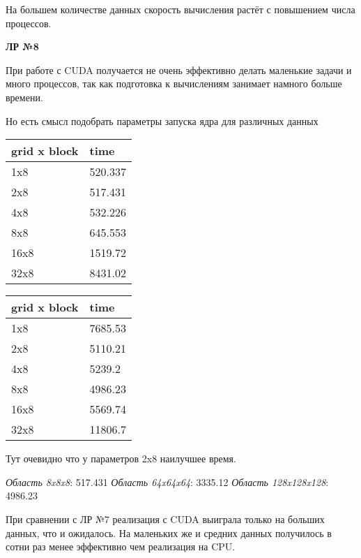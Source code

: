 \documentclass[12pt]{article}
\begin{document}
На большем количестве данных скорость вычисления растёт с повышением числа процессов.

\textbf{ЛР №8}

При работе с CUDA получается не очень эффективно делать маленькие задачи и много процессов,
так как подготовка к вычислениям занимает намного больше времени.

Но есть смысл подобрать параметры запуска ядра для различных данных

\begin{table*}[!ht]
	\caption*{Параметры запуска и время выполнения}
	\begin{minipage}{.49\linewidth}
		\caption*{задача 8x8x8, точность $1e^{-10}$}
		\begin{tabularx}{\linewidth}{|X|X|}
			\hline
			grid x block & time    \\
			\hline
			1x8          & 520.337 \\
			2x8          & 517.431 \\
			4x8          & 532.226 \\
			8x8          & 645.553 \\
			16x8         & 1519.72 \\
			32x8         & 8431.02 \\
			\hline
		\end{tabularx}
	\end{minipage}%
	\begin{minipage}{.49\linewidth}
		\caption*{задача 128x128x128, точность $1e^{-2}$}
		\begin{tabularx}{\linewidth}{|X|X|}
			\hline
			grid x block & time    \\
			\hline
			1x8          & 7685.53 \\
			2x8          & 5110.21 \\
			4x8          & 5239.2  \\
			8x8          & 4986.23 \\
			16x8         & 5569.74 \\
			32x8         & 11806.7 \\
			\hline
		\end{tabularx}
	\end{minipage}
\end{table*}

Тут очевидно что у параметров 2x8 наилучшее время.

\textit{Область 8x8x8}: 517.431
\textit{Область 64x64x64}: 3335.12
\textit{Область 128x128x128}: 4986.23

При сравнении с ЛР №7 реализация с CUDA выиграла только на больших данных,
что и ожидалось. На маленьких же и средних данных получилось в сотни раз менее эффективно
чем реализация на CPU.
\end{document}
